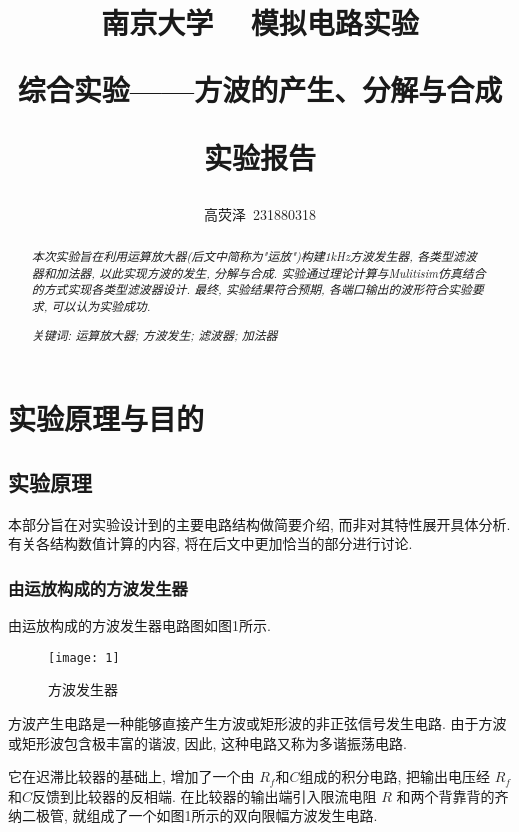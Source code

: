 \documentclass[UTF2]{ctexart}
\title{
	南京大学 ~ 模拟电路实验
	
	综合实验------方波的产生、分解与合成
	
	实验报告
}
\author{高荧泽~231880318}
\begin{document}
	\begin{titlepage}
		\maketitle
		\setcounter{page}{0}
		\thispagestyle{empty}
	\end{titlepage}
	
	\begin{abstract}
		
		\textit{本次实验旨在利用运算放大器(后文中简称为"运放")构建1kHz方波发生器, 各类型滤波器和加法器, 以此实现方波的发生, 分解与合成. 实验通过理论计算与Mulitisim仿真结合的方式实现各类型滤波器设计. 最终, 实验结果符合预期, 各端口输出的波形符合实验要求, 可以认为实验成功.}
		
		\textit{关键词: 运算放大器; 方波发生; 滤波器; 加法器}
	\end{abstract}
	
	\newpage
    \tableofcontents
	
	\newpage
	
	\section{实验原理与目的}
	
	\subsection{实验原理}
	
	本部分旨在对实验设计到的主要电路结构做简要介绍, 而非对其特性展开具体分析. 有关各结构数值计算的内容, 将在后文中更加恰当的部分进行讨论.
	\subsubsection{由运放构成的方波发生器}
	
	由运放构成的方波发生器电路图如图1所示. 
	
	\begin{figure}[h]
		\centering
		\texttt{[image: 1]}
		\caption{方波发生器}
	\end{figure}
	
	方波产生电路是一种能够直接产生方波或矩形波的非正弦信号发生电路. 由于方波或矩形波包含极丰富的谐波, 因此, 这种电路又称为多谐振荡电路.
	
	它在迟滞比较器的基础上, 增加了一个由 $R_f$和$C $组成的积分电路, 把输出电压经 $R_f$和$C$反馈到比较器的反相端. 在比较器的输出端引入限流电阻 $R$ 和两个背靠背的齐纳二极管, 就组成了一个如图1所示的双向限幅方波发生电路.
	
\end{document}
